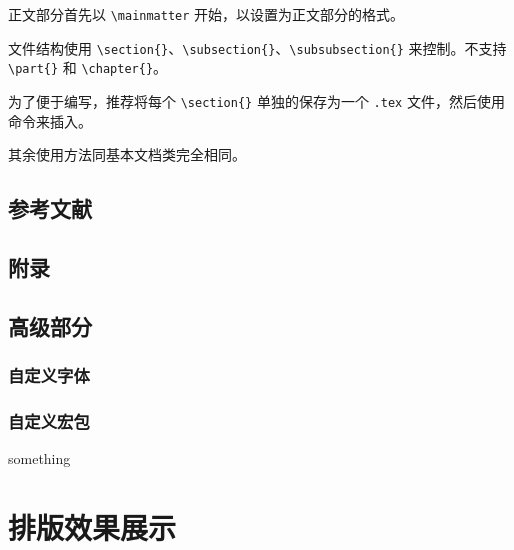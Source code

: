\documentclass[%
               print, 
               timesmath
              ]{xjtubsc}
\begin{document}
正文部分首先以 \verb|\mainmatter| 开始，以设置为正文部分的格式。

文件结构使用 \verb|\section{}|、\verb|\subsection{}|、\verb|\subsubsection{}| 来控制。不支持 \verb|\part{}| 和 \verb|\chapter{}|。

为了便于编写，推荐将每个 \verb|\section{}| 单独的保存为一个 \verb|.tex| 文件，然后使用 \verb|| 命令来插入。

其余使用方法同基本文档类完全相同。

\subsection{参考文献}

\subsection{附录}

\subsection{高级部分}

\subsubsection{自定义字体}
\subsubsection{自定义宏包}
something

\section{排版效果展示}
\end{document}
